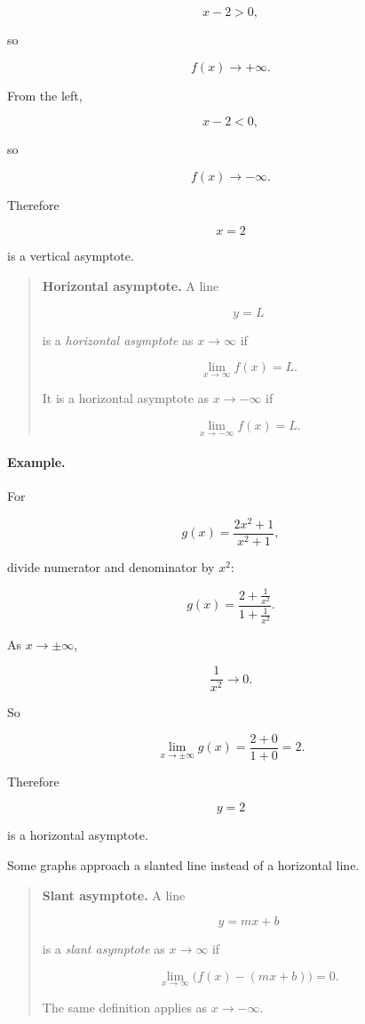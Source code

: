 \[
x-2>0,
\]

so

\[
f(x)\to+\infty.
\]

From the left,

\[
x-2<0,
\]

so

\[
f(x)\to-\infty.
\]

Therefore

\[
x=2
\]

is a vertical asymptote.

\begin{quote}
\textbf{Horizontal asymptote.}
A line

\[
y=L
\]

is a \emph{horizontal asymptote} as \(x\to\infty\) if

\[
\lim_{x\to\infty} f(x)=L.
\]

It is a horizontal asymptote as \(x\to-\infty\) if

\[
\lim_{x\to-\infty} f(x)=L.
\]
\end{quote}

\paragraph{Example.}
For

\[
g(x)=\frac{2x^2+1}{x^2+1},
\]

divide numerator and denominator by \(x^2\):

\[
g(x)=\frac{2+\frac1{x^2}}{1+\frac1{x^2}}.
\]

As \(x\to\pm\infty\),

\[
\frac1{x^2}\to0.
\]

So

\[
\lim_{x\to\pm\infty}g(x)=\frac{2+0}{1+0}=2.
\]

Therefore

\[
y=2
\]

is a horizontal asymptote.

Some graphs approach a slanted line instead of a horizontal line.

\begin{quote}
\textbf{Slant asymptote.}
A line

\[
y=mx+b
\]

is a \emph{slant asymptote} as \(x\to\infty\) if

\[
\lim_{x\to\infty}\bigl(f(x)-(mx+b)\bigr)=0.
\]

The same definition applies as \(x\to-\infty\).
\end{quote}


